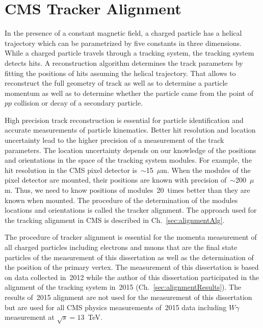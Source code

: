 \chapter{CMS Tracker Alignment} %
\label{sec:alignment}

In the presence of a constant magnetic field, a charged particle has a helical trajectory which can be parametrized by five constants in three dimensions. While a charged particle travels through a tracking system, the tracking system detects hits. A reconstruction algorithm determines the track parameters by fitting the positions of hits assuming the helical trajectory. That allows to reconstruct the full geometry of track as well as to determine a particle momentum as well as to determine whether the particle came from the point of $pp$ collision or decay of a secondary particle.

High precision track reconstruction is essential for particle identification and accurate measurements of particle kinematics. Better hit resolution and location uncertainty lead to the higher precision of a measurement of the track parameters. The location uncertainty depends on our knowledge of the positions and orientations in the space of the tracking system modules. For example, the hit resolution in the CMS pixel detector is~$\sim$15~$\mu$m. When the modules of the pixel detector are mounted, their positions are known with precision of~$\sim$200~$\mu$m. Thus, we need to know positions of modules~20~times better than they are known when mounted. The procedure of the determination of the modules locations and orientations is called the tracker alignment. The approach used for the tracking alignment in CMS is described in Ch.~\ref{sec:alignmentAlg}.

The procedure of tracker alignment is essential for the momenta measurement of all charged particles including electrons and muons that are the final state particles of the measurement of this dissertation as well as the determination of the position of the primary vertex. The measurement of this dissertation is based on data collected in~2012 while the author of this dissertation participated in the alignment of the tracking system in~2015 (Ch.~\ref{sec:alignmentResults}). The results of~2015 alignment are not used for the measurement of this dissertation but are used for all CMS physics measurements of~2015 data including $W\gamma$ measurement at $\sqrt{s}=13$~TeV. 

